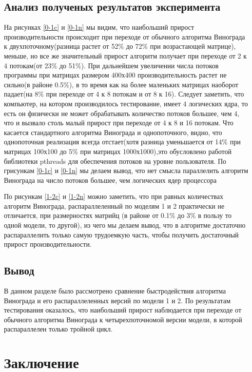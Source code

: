 \documentclass[a4paper, 14pt]{article}
\begin{document}
        \subsection{Анализ полученых результатов эксперимента}
        На рисунках \ref{0-1c} и \ref{0-1n} мы видим, что наибольший прирост производительности происходит при переходе от обычного алгоритма Винограда к двухпоточному(разница растет от 52\% до 72\% при возрастающей матрице), меньше, но все же значительный прирост алгоритм получает при переходе от 2 к 4 потокам(от 23\% до 51\%). При дальнейшем увеличении числа потоков программы при матрицах размером 400х400 производительность растет не сильно(в районе 0.5\%), в то время как на более маленьких матрицах наоборот падает(на 8\% при переходе от 4 к 8 потокам и от 8 к 16). Следует заметить, что компьютер, на котором производилось тестирование, имеет 4 логических ядра, то есть он физически не может обрабатывать количество потоков большее, чем 4, что и вызвало столь малый прирост при переходе от 4 к 8 и 16 потокам. Что касается стандартного алгоритма Винограда и однопоточного, видно, что однопоточная реализация всегда отстает(хотя разница уменьшается от 14\% при матрицах 100х100 до 5\% при матрицах 1000х1000),это обусловлено работой библиотеки pthreads для обеспечения потоков на уровне пользователя. По грисункам \ref{0-1c} и \ref{0-1n} мы делаем вывод, что нет смысла параллелить алгоритм Винограда на число потоков большее, чем логических ядер процессора
        
        По рисункам \ref{1-2c} и \ref{1-2n} можно заметить, что при равных количествах алгоритм Винограда, распараллеленный по моделям 1 и 2 практически не отличается, при размерностях матрийц (в районе от 0.1\% до 3\% в пользу то одной модели, то другой), из чего мы делаем вывод, что в алгоритме достаточно распараллелить только самую трудоемкую часть, чтобы получить достаточный прирост производительности.
        \newpage 
	\subsection{Вывод}
	В данном разделе было рассмотрено сравнение быстродействия алгоритма Винограда и его распараллеленных версий по модели 1 и 2. По результатам тестирования оказалось, что наибольший прирост наблюдается при переходе от обычного алгоритма Винограда к четырехпоточномой версии модели, в которой распараллелен только тройной цикл.

    	\newpage
        \section*{Заключение}
        
\end{document}
